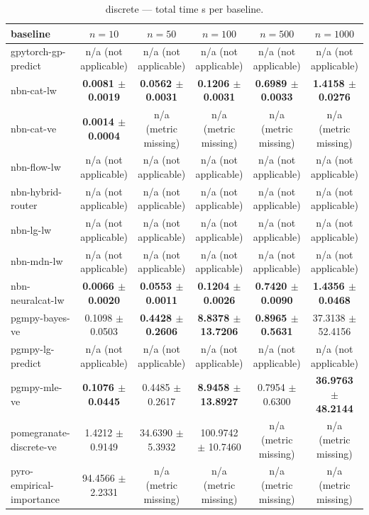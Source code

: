 \begin{table}[h]
\centering
\caption{discrete — total time s per baseline.}
\label{tab:discrete_total_time_s}
\begin{tabular}{lccccc}
\toprule
baseline & $n=10$ & $n=50$ & $n=100$ & $n=500$ & $n=1000$ \\
\midrule
gpytorch-gp-predict & n/a (not applicable) & n/a (not applicable) & n/a (not applicable) & n/a (not applicable) & n/a (not applicable) \\
nbn-cat-lw & \textbf{0.0081 $\pm$ 0.0019} & \textbf{0.0562 $\pm$ 0.0031} & \textbf{0.1206 $\pm$ 0.0031} & \textbf{0.6989 $\pm$ 0.0033} & \textbf{1.4158 $\pm$ 0.0276} \\
nbn-cat-ve & \textbf{0.0014 $\pm$ 0.0004} & n/a (metric missing) & n/a (metric missing) & n/a (metric missing) & n/a (metric missing) \\
nbn-flow-lw & n/a (not applicable) & n/a (not applicable) & n/a (not applicable) & n/a (not applicable) & n/a (not applicable) \\
nbn-hybrid-router & n/a (not applicable) & n/a (not applicable) & n/a (not applicable) & n/a (not applicable) & n/a (not applicable) \\
nbn-lg-lw & n/a (not applicable) & n/a (not applicable) & n/a (not applicable) & n/a (not applicable) & n/a (not applicable) \\
nbn-mdn-lw & n/a (not applicable) & n/a (not applicable) & n/a (not applicable) & n/a (not applicable) & n/a (not applicable) \\
nbn-neuralcat-lw & \textbf{0.0066 $\pm$ 0.0020} & \textbf{0.0553 $\pm$ 0.0011} & \textbf{0.1204 $\pm$ 0.0026} & \textbf{0.7420 $\pm$ 0.0090} & \textbf{1.4356 $\pm$ 0.0468} \\
pgmpy-bayes-ve & 0.1098 $\pm$ 0.0503 & \textbf{0.4428 $\pm$ 0.2606} & \textbf{8.8378 $\pm$ 13.7206} & \textbf{0.8965 $\pm$ 0.5631} & 37.3138 $\pm$ 52.4156 \\
pgmpy-lg-predict & n/a (not applicable) & n/a (not applicable) & n/a (not applicable) & n/a (not applicable) & n/a (not applicable) \\
pgmpy-mle-ve & \textbf{0.1076 $\pm$ 0.0445} & 0.4485 $\pm$ 0.2617 & \textbf{8.9458 $\pm$ 13.8927} & 0.7954 $\pm$ 0.6300 & \textbf{36.9763 $\pm$ 48.2144} \\
pomegranate-discrete-ve & 1.4212 $\pm$ 0.9149 & 34.6390 $\pm$ 5.3932 & 100.9742 $\pm$ 10.7460 & n/a (metric missing) & n/a (metric missing) \\
pyro-empirical-importance & 94.4566 $\pm$ 2.2331 & n/a (metric missing) & n/a (metric missing) & n/a (metric missing) & n/a (metric missing) \\
\bottomrule
\end{tabular}
\end{table}

